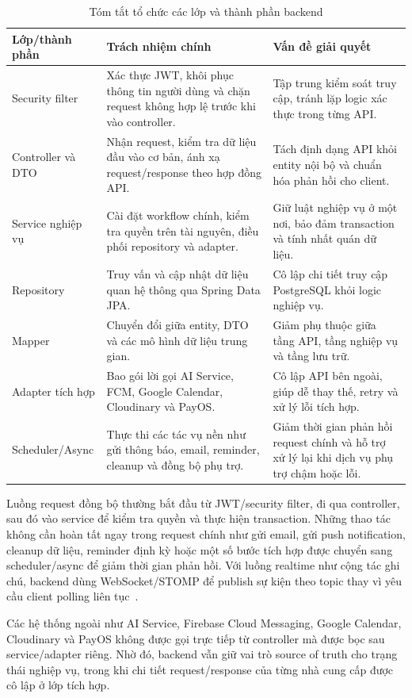 \begin{table}[htbp]
    \centering
    \small
    \caption{Tóm tắt tổ chức các lớp và thành phần backend}
    \label{tab:backend-layer-summary}
    \renewcommand{\arraystretch}{1.15}
    \begin{tabular}{|L{0.22\textwidth}|L{0.34\textwidth}|L{0.32\textwidth}|}
        \hline
        \textbf{Lớp/thành phần} & \textbf{Trách nhiệm chính} & \textbf{Vấn đề giải quyết} \\
        \hline
        Security filter & Xác thực JWT, khôi phục thông tin người dùng và chặn request không hợp lệ trước khi vào controller. & Tập trung kiểm soát truy cập, tránh lặp logic xác thực trong từng API. \\
        \hline
        Controller và DTO & Nhận request, kiểm tra dữ liệu đầu vào cơ bản, ánh xạ request/response theo hợp đồng API. & Tách định dạng API khỏi entity nội bộ và chuẩn hóa phản hồi cho client. \\
        \hline
        Service nghiệp vụ & Cài đặt workflow chính, kiểm tra quyền trên tài nguyên, điều phối repository và adapter. & Giữ luật nghiệp vụ ở một nơi, bảo đảm transaction và tính nhất quán dữ liệu. \\
        \hline
        Repository & Truy vấn và cập nhật dữ liệu quan hệ thông qua Spring Data JPA. & Cô lập chi tiết truy cập PostgreSQL khỏi logic nghiệp vụ. \\
        \hline
        Mapper & Chuyển đổi giữa entity, DTO và các mô hình dữ liệu trung gian. & Giảm phụ thuộc giữa tầng API, tầng nghiệp vụ và tầng lưu trữ. \\
        \hline
        Adapter tích hợp & Bao gói lời gọi AI Service, FCM, Google Calendar, Cloudinary và PayOS. & Cô lập API bên ngoài, giúp dễ thay thế, retry và xử lý lỗi tích hợp. \\
        \hline
        Scheduler/Async & Thực thi các tác vụ nền như gửi thông báo, email, reminder, cleanup và đồng bộ phụ trợ. & Giảm thời gian phản hồi request chính và hỗ trợ xử lý lại khi dịch vụ phụ trợ chậm hoặc lỗi. \\
        \hline
    \end{tabular}
\end{table}

Luồng request đồng bộ thường bắt đầu từ JWT/security filter, đi qua controller, sau đó vào service để kiểm tra quyền và thực hiện transaction. Những thao tác không cần hoàn tất ngay trong request chính như gửi email, gửi push notification, cleanup dữ liệu, reminder định kỳ hoặc một số bước tích hợp được chuyển sang scheduler/async để giảm thời gian phản hồi. Với luồng realtime như cộng tác ghi chú, backend dùng WebSocket/STOMP để publish sự kiện theo topic thay vì yêu cầu client polling liên tục~\cite{springwebsocketstomp}.

Các hệ thống ngoài như AI Service, Firebase Cloud Messaging, Google Calendar, Cloudinary và PayOS không được gọi trực tiếp từ controller mà được bọc sau service/adapter riêng. Nhờ đó, backend vẫn giữ vai trò source of truth cho trạng thái nghiệp vụ, trong khi chi tiết request/response của từng nhà cung cấp được cô lập ở lớp tích hợp.